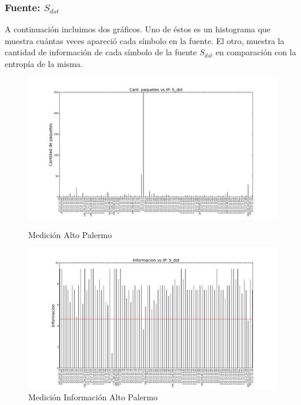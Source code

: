 \subsubsection{Fuente: $S_{dst}$}

A continuación incluimos dos gráficos. Uno de éstos es un histograma que muestra cuántas veces apareció cada símbolo en la fuente. El otro, muestra la cantidad de información de cada símbolo de la fuente $S_{dst}$ en comparación con la entropía de la misma. 

\begin{figure}[H]
   \begin{minipage}{0.5\linewidth}
     \includegraphics[width=\linewidth]{../imgs/red-alto-palermo_S_dst_hist.png}
     \caption{Medición Alto Palermo}\label{fig:Alto-dst-hist}
   \end{minipage}
  \hfill
   \begin{minipage}{0.5\linewidth}
     \includegraphics[width=\linewidth]{../imgs/red-alto-palermo_S_dst_info.png}
     \caption{Medición Información Alto Palermo}\label{fig:Alto-dst-info}
   \end{minipage}
 \end{figure}

